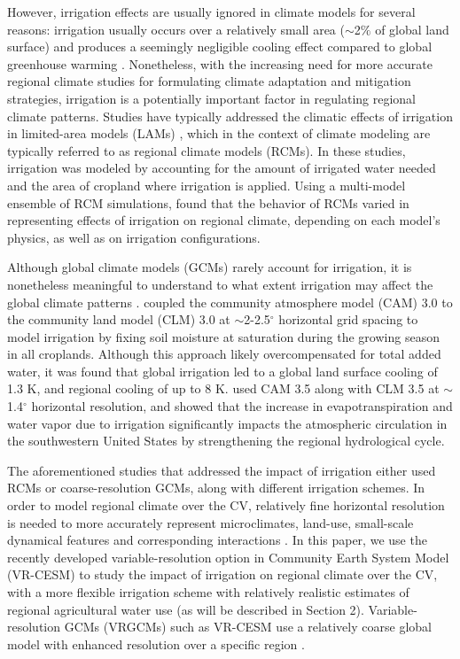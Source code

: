 \documentclass[draft,ms]{agutex}   %
\begin{document}
\begin{article}
However, irrigation effects are usually ignored in climate models for several reasons: irrigation usually occurs over a relatively small area ($\sim$2$\%$ of global land surface) and produces a seemingly negligible cooling effect compared to global greenhouse warming \citep{boucher2004direct}. Nonetheless, with the increasing need for more accurate regional climate studies for formulating climate adaptation and mitigation strategies, irrigation is a potentially important factor in regulating regional climate patterns. Studies have typically addressed the climatic effects of irrigation in limited-area models (LAMs) \citep{snyder2006regional, kueppers2007irrigation}, which in the context of climate modeling are typically referred to as regional climate models (RCMs). In these studies, irrigation was modeled by accounting for the amount of irrigated water needed and the area of cropland where irrigation is applied. Using a multi-model ensemble of RCM simulations, \cite{kueppers2008seasonal} found that the behavior of RCMs varied in representing effects of irrigation on regional climate, depending on each model's physics, as well as on irrigation configurations.

Although global climate models (GCMs) rarely account for irrigation, it is nonetheless meaningful to understand to what extent irrigation may affect the global climate patterns \citep{sacks2009effects}. \citet{lobell2006biogeophysical} coupled the community atmosphere model (CAM) 3.0 to the community land model (CLM) 3.0 at $\sim$2-2.5$^\circ$ horizontal grid spacing to model irrigation by fixing soil moisture at saturation during the growing season in all croplands. Although this approach likely overcompensated for total added water, it was found that global irrigation led to a global land surface cooling of 1.3 K, and regional cooling of up to 8 K. \citet{lo2013irrigation} used CAM 3.5 along with CLM 3.5 at $\sim$1.4$^\circ$ horizontal resolution, and showed that the increase in evapotranspiration and water vapor due to irrigation significantly impacts the atmospheric circulation in the southwestern United States by strengthening the regional hydrological cycle. 

The aforementioned studies that addressed the impact of irrigation either used RCMs or coarse-resolution GCMs, along with different irrigation schemes. In order to model regional climate over the CV, relatively fine horizontal resolution is needed to more accurately represent microclimates, land-use, small-scale dynamical features and corresponding interactions \citep{leung2003regional, rauscher2010resolution}. In this paper, we use the recently developed variable-resolution option in Community Earth System Model (VR-CESM) to study the impact of irrigation on regional climate over the CV, with a more flexible irrigation scheme with relatively realistic estimates of regional agricultural water use (as will be described in Section 2). Variable-resolution GCMs (VRGCMs) such as VR-CESM use a relatively coarse global model with enhanced resolution over a specific region \citep{staniforth1978variable, fox1997finite}. 



\end{article}
\end{document}

